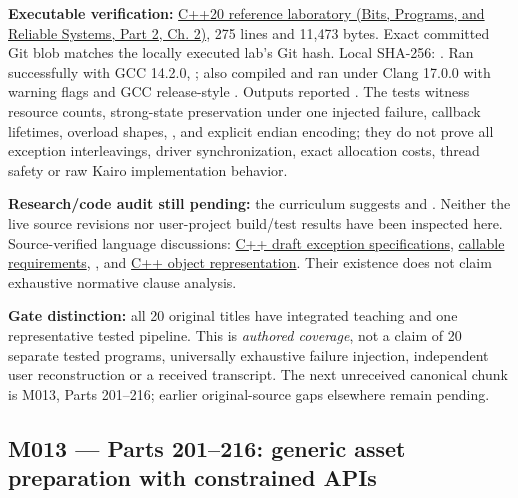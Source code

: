 \textbf{Executable verification:} \href{../01-Bits-Programs-and-Reliable-Systems-P02/main.pdf\#nameddest=source-file-32e93bc026677e074aaa7771}{C++20 reference laboratory (Bits, Programs, and Reliable Systems, Part 2, Ch. 2)}, 275 lines and 11,473 bytes. Exact committed Git blob  matches the locally executed lab's Git hash. Local SHA-256: . Ran successfully with GCC 14.2.0, ; also compiled and ran under Clang 17.0.0 with warning flags and GCC release-style . Outputs reported . The tests witness resource counts, strong-state preservation under one injected failure, callback lifetimes, overload shapes, , and explicit endian encoding; they do not prove all exception interleavings, driver synchronization, exact allocation costs, thread safety or raw Kairo implementation behavior.

\textbf{Research/code audit still pending:} the curriculum suggests  and . Neither the live source revisions nor user-project build/test results have been inspected here. Source-verified language discussions: \href{https://eel.is/c++draft/except.spec}{C++ draft exception specifications}, \href{https://en.cppreference.com/w/cpp/utility/functional/function}{ callable requirements}, \href{https://en.cppreference.com/w/cpp/numeric/bit_cast}{}, and \href{https://en.cppreference.com/w/cpp/language/object}{C++ object representation}. Their existence does not claim exhaustive normative clause analysis.

\textbf{Gate distinction:} all 20 original titles have integrated teaching and one representative tested pipeline. This is \emph{authored coverage}, not a claim of 20 separate tested programs, universally exhaustive failure injection, independent user reconstruction or a received transcript. The next unreceived canonical chunk is M013, Parts 201--216; earlier original-source gaps elsewhere remain pending.

\subsection{M013 --- Parts 201--216: generic asset preparation with constrained APIs}\label{appendix-fd090d982a15-m013-parts-201216-generic-asset-preparation-with-constrained-apis}

